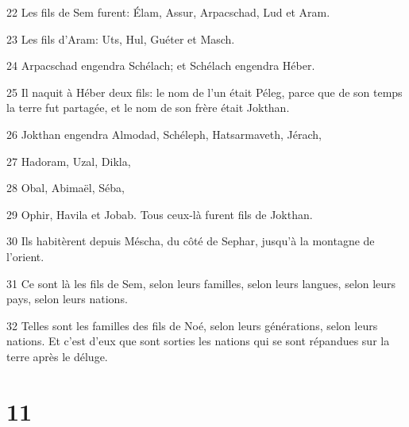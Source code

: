 \par 22 Les fils de Sem furent: Élam, Assur, Arpacschad, Lud et Aram.
\par 23 Les fils d'Aram: Uts, Hul, Guéter et Masch.
\par 24 Arpacschad engendra Schélach; et Schélach engendra Héber.
\par 25 Il naquit à Héber deux fils: le nom de l'un était Péleg, parce que de son temps la terre fut partagée, et le nom de son frère était Jokthan.
\par 26 Jokthan engendra Almodad, Schéleph, Hatsarmaveth, Jérach,
\par 27 Hadoram, Uzal, Dikla,
\par 28 Obal, Abimaël, Séba,
\par 29 Ophir, Havila et Jobab. Tous ceux-là furent fils de Jokthan.
\par 30 Ils habitèrent depuis Méscha, du côté de Sephar, jusqu'à la montagne de l'orient.
\par 31 Ce sont là les fils de Sem, selon leurs familles, selon leurs langues, selon leurs pays, selon leurs nations.
\par 32 Telles sont les familles des fils de Noé, selon leurs générations, selon leurs nations. Et c'est d'eux que sont sorties les nations qui se sont répandues sur la terre après le déluge.

\chapter{11}

